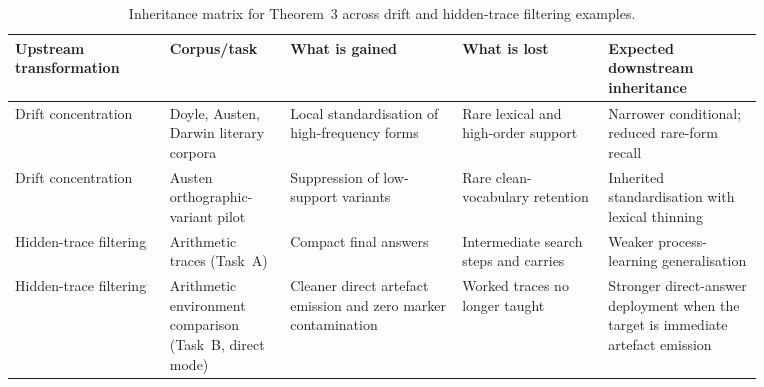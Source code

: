 \begin{table}[t]
\centering
\footnotesize
\setlength{\tabcolsep}{3.5pt}
\caption{Inheritance matrix for Theorem~3 across drift and hidden-trace filtering examples.}
\label{tab:appx-theorem3-inheritance-matrix}
\begin{tabular}{p{0.18\linewidth}p{0.14\linewidth}p{0.20\linewidth}p{0.17\linewidth}p{0.18\linewidth}}
\toprule
Upstream transformation & Corpus/task & What is gained & What is lost & Expected downstream inheritance \\
\midrule
Drift concentration & Doyle, Austen, Darwin literary corpora & Local standardisation of high-frequency forms & Rare lexical and high-order support & Narrower conditional; reduced rare-form recall \\
Drift concentration & Austen orthographic-variant pilot & Suppression of low-support variants & Rare clean-vocabulary retention & Inherited standardisation with lexical thinning \\
Hidden-trace filtering & Arithmetic traces (Task~A) & Compact final answers & Intermediate search steps and carries & Weaker process-learning generalisation \\
Hidden-trace filtering & Arithmetic environment comparison (Task~B, direct mode) & Cleaner direct artefact emission and zero marker contamination & Worked traces no longer taught & Stronger direct-answer deployment when the target is immediate artefact emission \\
\bottomrule
\end{tabular}
\end{table}
